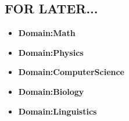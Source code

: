 \documentclass[12pt]{article}
\begin{document}
\subsection*{FOR LATER...}

\begin{itemize}
\item {\bf Domain:Math}
\item {\bf Domain:Physics}
\item {\bf Domain:ComputerScience}
\item {\bf Domain:Biology}
\item {\bf Domain:Linguistics}
\end{itemize}
\end{document}
